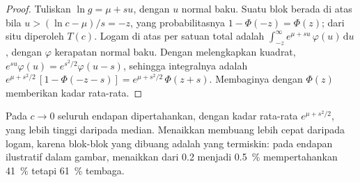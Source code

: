 \begin{proof}
Tuliskan $\ln g = \mu + s u$, dengan $u$ normal baku. Suatu blok berada di atas  bila $u > (\ln c -
\mu)/s = -z$, yang probabilitasnya $1 - \Phi(-z) = \Phi(z)$; dari situ diperoleh $T(c)$. Logam di atas
 per satuan  total adalah $\int_{-z}^{\infty} e^{\mu + s u}\,\varphi(u)\,\mathrm{d}u$,
dengan $\varphi$ kerapatan normal baku. Dengan melengkapkan kuadrat, $e^{su}\varphi(u) =
e^{s^2/2}\varphi(u - s)$, sehingga integralnya adalah $e^{\mu + s^2/2}\,[1 - \Phi(-z - s)] = e^{\mu +
s^2/2}\,\Phi(z + s)$. Membaginya dengan $\Phi(z)$ memberikan kadar rata-rata.
\end{proof}

Pada $c \to 0$ seluruh endapan dipertahankan, dengan kadar rata-rata $e^{\mu + s^2/2}$, yang lebih tinggi daripada
median. Menaikkan  membuang  lebih cepat daripada logam, karena blok-blok yang dibuang adalah yang
termiskin: pada endapan ilustratif dalam gambar, menaikkan  dari 0.2 menjadi
\qty{0.5}{\percent} mempertahankan \qty{41}{\percent}  tetapi \qty{61}{\percent} tembaga.

